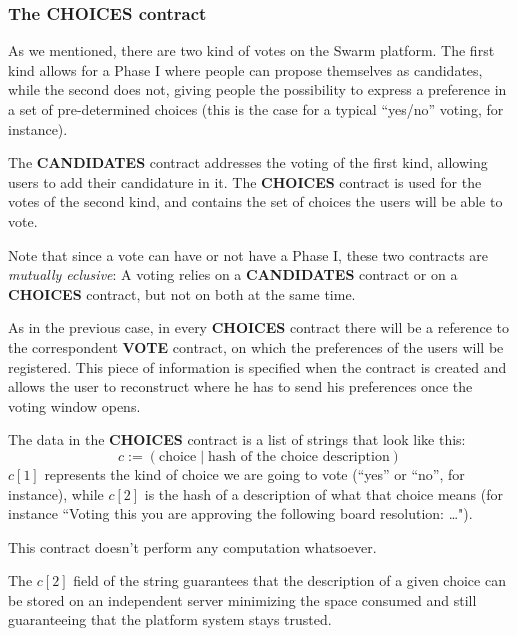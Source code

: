 \documentclass[submission, copyright,creativecommons,sharealike,noncommercial]{eptcs}
\newcommand{\Candidates}{\textbf{CANDIDATES}\xspace}
\newcommand{\Choices}{\textbf{CHOICES}\xspace}
\newcommand{\Vote}{\textbf{VOTE}\xspace}
\begin{document}
\subsubsection{The \Choices contract}
	As we mentioned, there are two kind of votes on the Swarm platform. The first kind allows for a Phase I where people can propose themselves as candidates, while the second does not, giving people the possibility to express a preference in a set of pre-determined choices (this is the case for a typical ``yes/no'' voting, for instance).
	
	The \Candidates contract addresses the voting of the first kind, allowing users to add their candidature in it. The \Choices contract is used for the votes of the second kind, and contains the set of choices the users will be able to vote. 
	
	Note that since a vote can have or not have a Phase I, these two contracts are \emph{mutually eclusive}: A voting relies on a \Candidates contract or on a \Choices contract, but not on both at the same time.
	
	As in the previous case, in every \Choices contract there will be a reference to the correspondent \Vote contract, on which the preferences of the users will be registered. This piece of information is specified when the contract is created and allows the user to reconstruct where he has to send his preferences once the voting window opens.
	
	The data in the \Choices contract is a list of strings that look like this: 
	\[
	c := (\text{choice} \mid \text{hash of the choice description})
	\]
	$c[1]$ represents the kind of choice we are going to vote (``yes'' or ``no'', for instance), while $c[2]$ is the hash of a description of what that choice means (for instance ``Voting this you are approving the following board resolution: \dots"). 

	This contract doesn't perform any computation whatsoever.
	
	The $c[2]$ field of the string guarantees that the description of a given choice can be stored on an independent server minimizing the space consumed and still guaranteeing that the platform system stays trusted.	 
%
%
\end{document}

